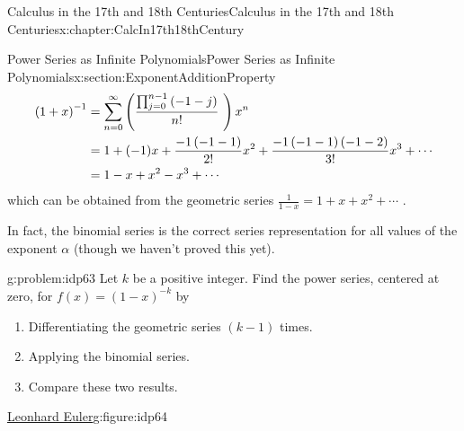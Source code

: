 \begin{chapterptx}{Calculus in the 17th and 18th Centuries}{}{Calculus in the 17th and 18th Centuries}{}{}{x:chapter:CalcIn17th18thCentury}
\begin{sectionptx}{Power Series as Infinite Polynomials}{}{Power Series as Infinite Polynomials}{}{}{x:section:ExponentAdditionProperty}
\begin{align*}
			\left(1+x\right)^{-1}& =\sum_{n=0}^\infty\left(\frac{\prod_{j=0}^{n-1}\left(-1-j\right)}{n!}\text{ } \right)x^n\\
			& =1+(-1)x+\frac{-1\left(-1-1\right)}{2!}x^2+\frac{-1\left(-1-1\right)\left(-1-2\right)}{3!}x^3+\cdots\\
			& =1-x+x^2-x^3+\cdots
		\end{align*}
		which can be obtained from the geometric series \(\frac{1}{1-x}=1+x+x^2+\cdots\) .%
		\par
		In fact, the binomial series is the correct series representation for all values of the exponent \(\alpha\) (though we haven't proved this yet).%
		\begin{problem}{}{g:problem:idp63}%
			Let \(k\) be a positive integer. Find the power series, centered at zero, for \(f(x) = \left(1-x\right)^{-k}\) by%
			\begin{enumerate}[font=\bfseries,label=(\alph*),ref=\alph*]
				\item{}Differentiating the  geometric series \(\left(k-1\right)\) times.%
				\item{}Applying the binomial series.%
				\item{}Compare these two results.%
			\end{enumerate}
		\end{problem}
		\begin{figureptx}{\href{https://mathshistory.st-andrews.ac.uk/Biographies/Euler/}{Leonhard Euler}\protect\footnotemark{}}{g:figure:idp64}{}%
			\begin{image}{0.325}{0.35}{0.325}%

\end{image}
\end{figureptx}
\end{sectionptx}
\end{chapterptx}
